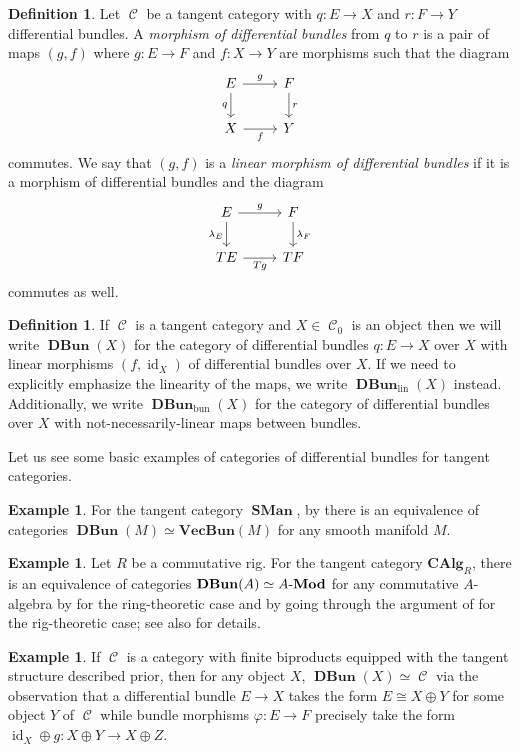 \documentclass{amsart}
\theoremstyle{definition}
\newtheorem{example}[equation]{Example}
\newtheorem{definition}[equation]{Definition}
\DeclareMathOperator{\Cscr}{\mathscr{C}}
\DeclareMathOperator{\id}{id}
\DeclareMathOperator{\SMan}{\mathbf{SMan}}
\newcommand{\CAlg}[1]{\mathbf{CAlg}_{#1}}
\DeclareMathOperator{\DBun}{\mathbf{DBun}}
\newcommand{\Mod}[1]{{#1}\textnormal{-}\mathbf{Mod}}
\numberwithin{equation}{subsection}
\begin{document}
\begin{definition}\label{Defn: Section Tangent: Morphism of dbundles}
	Let $\Cscr$ be a tangent category with $q:E \to X$ and $r:F \to Y$ differential bundles. A \emph{morphism of differential bundles} from $q$ to $r$ is a pair of maps $(g,f)$ where $g:E \to F$ and $f:X \to Y$ are morphisms such that the diagram
	\[
	\begin{tikzcd}
		E \ar[r]{}{g} \ar[d, swap]{}{q} & F \ar[d]{}{r} \\
		X \ar[r, swap]{}{f} & Y
	\end{tikzcd}
	\]
	commutes. We say that $(g,f)$ is a \emph{linear morphism of differential bundles} if it is a morphism of differential bundles and the diagram
	\[
	\begin{tikzcd}
		E \ar[r]{}{g} \ar[d, swap]{}{\lambda_E} & F \ar[d]{}{\lambda_F} \\
		TE \ar[r, swap]{}{Tg} & TF
	\end{tikzcd}
	\]
	commutes as well.
\end{definition}
\begin{definition}
	If $\Cscr$ is a tangent category and $X \in \Cscr_0$ is an object then we will write $\DBun(X)$ for the category of differential bundles $q:E \to X$ over $X$ with linear morphisms $(f,\id_X)$ of differential bundles over $X$. If we need to explicitly emphasize the linearity of the maps, we write $\DBun_{\operatorname{lin}}(X)$ instead. Additionally, we write $\DBun_{\operatorname{bun}}(X)$ for the category of differential bundles over $X$ with not-necessarily-linear maps between bundles.
\end{definition}

Let us see some basic examples of categories of differential bundles for tangent categories.
\begin{example}
For the tangent category $\SMan$, by \cite[Theorem 1]{BenVectorBundles} there is an equivalence of categories $\DBun(M) \simeq \mathbf{VecBun}(M)$ for any smooth manifold $M$.
\end{example}
\begin{example}
Let $R$ be a commutative rig. For the tangent category $\CAlg{R}$, there is an equivalence of categories $\DBun(A) \simeq \Mod{A}$ for any commutative $A$-algebra by \cite[Theorem 3.13]{GeoffJSDiffBunComAlg} for the ring-theoretic case and by going through the argument of \cite[Remark 3.15]{GeoffJSDiffBunComAlg} for the rig-theoretic case; see also \cite[Example 2.2.3]{JSMeMapFlavoursInTanCats} for details.
\end{example}
\begin{example}
If $\Cscr$ is a category with finite biproducts equipped with the tangent structure described prior, then for any object $X$, $\DBun(X) \simeq \Cscr$ via the observation that a differential bundle $E \to X$ takes the form $E \cong X \oplus Y$ for some object $Y$ of $\Cscr$ while bundle morphisms $\varphi:E \to F$ precisely take the form $\id_X \oplus g:X \oplus Y \to X \oplus Z$.
\end{example}
\end{document}
